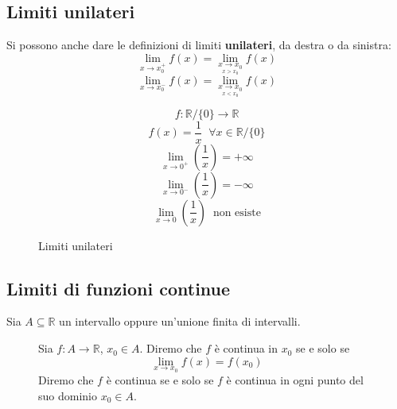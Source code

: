 \documentclass[a4paper]{article}
\theoremstyle{break}
\theoremstyle{break}
\theoremstyle{break}
\theoremstyle{break}
\begin{document}
\subsection{Limiti unilateri}
Si possono anche dare le definizioni di limiti \textbf{unilateri}, da destra o da sinistra:
\[
  \lim_{x \to x_0^+} f(x) = \lim_{\underset{x > x_0}{x \to x_0}} f(x)
\]
\[
  \lim_{x \to x_0^-} f(x) = \lim_{\underset{x < x_0}{x \to x_0}} f(x)
\]
\begin{example}
  \[
    f: \mathbb{R} / \{0\} \to \mathbb{R}
  \]
  \[
    f(x) = \frac{1}{x}\;\; \forall x \in \mathbb{R} / \{0\}
  \]
  \[
    \lim_{x \to 0^+} (\frac{1}{x}) = +\infty
  \]
  \[
    \lim_{x \to 0^-} (\frac{1}{x}) = -\infty
  \]
  \[
    \lim_{x \to 0} (\frac{1}{x})\;\; \text{non esiste}
  \]

  \begin{figure}[H]
    \begin{center}
    \end{center}
    \caption{Limiti unilateri}
  \end{figure}

\end{example}

\subsection{Limiti di funzioni continue}
Sia \( A \subseteq \mathbb{R} \) un intervallo oppure un'unione finita di intervalli.
\begin{figure}[H]
  \begin{definition}
    Sia \( f: A \to  \mathbb{R} \), \( x_0 \in A \). Diremo che \( f \) è continua in \( x_0 \)
    se e solo se
    \[
      \lim_{x \to x_0} f(x) = f(x_0)
    \]
    Diremo che \( f \) è continua se e solo se \( f \) è continua in ogni punto del suo dominio
    \( x_0 \in A \).
  \end{definition}
\end{figure}
\end{document}
